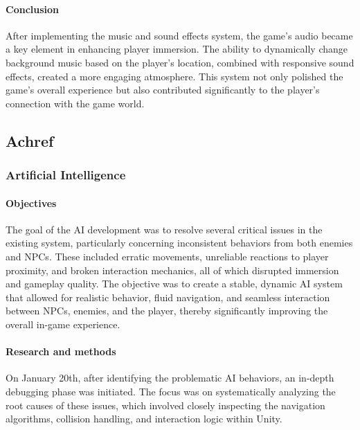 \documentclass{article}
\begin{document}
\paragraph{Conclusion}\hfill

After implementing the music and sound effects system, the game's audio became a key element in enhancing player immersion. The ability to dynamically change background music based on the player's location, combined with responsive sound effects, created a more engaging atmosphere. This system not only polished the game's overall experience but also contributed significantly to the player's connection with the game world.





\newpage
\subsection{Achref}
\subsubsection{Artificial Intelligence}
\paragraph{Objectives}\hfill

The goal of the AI development was to resolve several critical issues in the existing system, particularly concerning inconsistent behaviors from both enemies and NPCs. These included erratic movements, unreliable reactions to player proximity, and broken interaction mechanics, all of which disrupted immersion and gameplay quality. The objective was to create a stable, dynamic AI system that allowed for realistic behavior, fluid navigation, and seamless interaction between NPCs, enemies, and the player, thereby significantly improving the overall in-game experience.

\paragraph{Research and methods}\hfill

On January 20th, after identifying the problematic AI behaviors, an in-depth debugging phase was initiated. The focus was on systematically analyzing the root causes of these issues, which involved closely inspecting the navigation algorithms, collision handling, and interaction logic within Unity.\\
\end{document}
